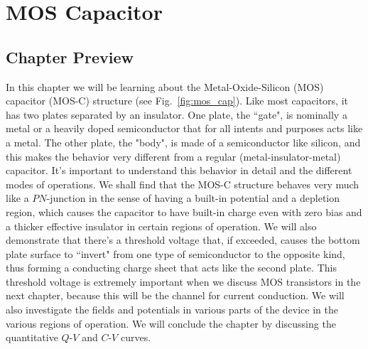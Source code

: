 \chapter{MOS Capacitor}
\label{ch:ch07_mos_c}
\graphicspath{{./figs_MOS_C/}}
\section{Chapter Preview}
In this chapter we will be learning about the Metal-Oxide-Silicon (MOS) capacitor (MOS-C) structure (see Fig.~\ref{fig:mos_cap}).  Like most capacitors, it has two plates separated by an insulator.  One plate, the ``gate",  is nominally a metal or a heavily doped semiconductor that for all intents and purposes acts like a metal.  The other plate, the "body",  is made of a semiconductor like silicon, and this makes the behavior very different from a regular (metal-insulator-metal) capacitor. It's important to understand this behavior in detail and the different modes of operations.   We shall find that the MOS-C structure behaves very much like a $PN$-junction in the sense of having a built-in potential and a depletion region, which causes the capacitor to have built-in charge even with zero bias and a thicker effective insulator in certain regions of operation.  We will also demonstrate that there's a threshold voltage that, if exceeded, causes the bottom plate surface to ``invert" from one type of semiconductor to the opposite kind, thus forming a conducting charge sheet that acts like the second plate.  This threshold voltage is extremely important when we discuss MOS transistors in the next chapter, because this will be the channel for current conduction.  We will also investigate the fields and potentials in various parts of the device in the various regions of operation.  We will conclude the chapter by discussing the quantitative  $Q$-$V$ and $C$-$V$ curves.
